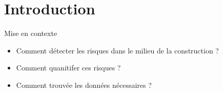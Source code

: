 \section{Introduction}


\begin{frame}[label=intro]{Mise en contexte}
	\begin{itemize}
		\item Comment détecter les risques dans le milieu de la construction ?
		\item Comment quanitifer ces risques ?
		\item Comment trouvée les données nécessaires ?
		
	\end{itemize}
\end{frame}
